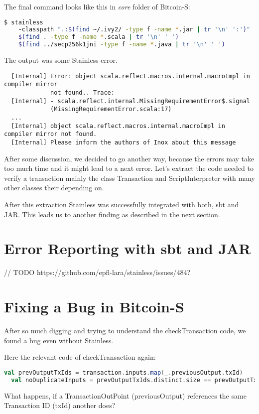 The final command looks like this in \emph{core} folder of Bitcoin-S:
\begin{lstlisting}[language=bash]
  $ stainless
    -classpath ".:$(find ~/.ivy2/ -type f -name *.jar | tr '\n' ':')"
    $(find . -type f -name *.scala | tr '\n' ' ')
    $(find ../secp256k1jni -type f -name *.java | tr '\n' ' ')
\end{lstlisting}

The output was some Stainless error.
\begin{lstlisting}
  [Internal] Error: object scala.reflect.macros.internal.macroImpl in compiler mirror
             not found.. Trace:
  [Internal] - scala.reflect.internal.MissingRequirementError$.signal
             (MissingRequirementError.scala:17)
  ...
  [Internal] object scala.reflect.macros.internal.macroImpl in compiler mirror not found.
  [Internal] Please inform the authors of Inox about this message
\end{lstlisting}

After some discussion, we decided to go another way, because the errors may take too much time and it might lead to a next error.
Let's extract the code needed to verify a transaction mainly the class Transaction and ScriptInterpreter with many other classes their depending on.

After this extraction Stainless was successfully integrated with both, sbt and JAR.
This leads us to another finding as described in the next section.


\section{Error Reporting with sbt and JAR}
// TODO https://github.com/epfl-lara/stainless/issues/484?


\section{Fixing a Bug in Bitcoin-S}
After so much digging and trying to understand the checkTransaction code, we found a bug even without Stainless.

Here the relevant code of checkTransaction again:
\begin{lstlisting}[language=scala]
  val prevOutputTxIds = transaction.inputs.map(_.previousOutput.txId)
  val noDuplicateInputs = prevOutputTxIds.distinct.size == prevOutputTxIds.size
\end{lstlisting}

What happens, if a TransactionOutPoint (previousOutput) references the same Transaction ID (txId) another does?

